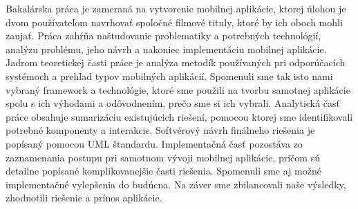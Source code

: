 Bakalárska práca je zameraná na vytvorenie mobilnej aplikácie, ktorej úlohou je dvom používateľom navrhovať spoločné filmové tituly, ktoré by ich oboch mohli zaujať. Práca zahŕňa naštudovanie problematiky a potrebných technológií, analýzu problému, jeho návrh a nakoniec implementáciu mobilnej aplikácie.
Jadrom teoretickej časti práce je analýza metodík používaných pri odporúčacích systémoch a prehľad typov mobilných aplikácií. Spomenuli sme tak isto nami vybraný framework a technológie, ktoré sme použili na tvorbu samotnej aplikácie spolu s ich výhodami a odôvodnením, prečo sme si ich vybrali. Analytická časť práce obsahuje sumarizáciu existujúcich riešení, pomocou ktorej sme identifikovali potrebné komponenty a interakcie. Softvérový návrh finálneho riešenia je popísaný pomocou UML štandardu.
Implementačná časť pozostáva zo zaznamenania postupu pri samotnom vývoji mobilnej aplikácie, pričom sú detailne popísané komplikovanejšie časti riešenia. Spomenuli sme aj možné implementačné vylepšenia do budúcna. Na záver sme zbilancovali naše výsledky, zhodnotili riešenie a prínos aplikácie. 